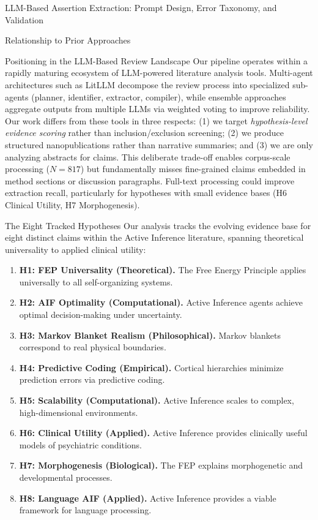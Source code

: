 \documentclass[
  ignorenonframetext,
]{beamer}
\providecommand{\tightlist}{%
  \setlength{\itemsep}{0pt}\setlength{\parskip}{0pt}}
\begin{document}
\begin{frame}{LLM-Based Assertion Extraction:
Prompt Design, Error Taxonomy, and Validation
\label{sec:extraction_pipeline}}
\begin{block}{Relationship to Prior Approaches}
\begin{block}{Positioning in the LLM-Based Review Landscape}
\protect{}\label{positioning-in-the-llm-based-review-landscape}
Our pipeline operates within a rapidly maturing ecosystem of LLM-powered
literature analysis tools. Multi-agent architectures such as LitLLM
decompose the review process into specialized sub-agents (planner,
identifier, extractor, compiler), while ensemble approaches aggregate
outputs from multiple LLMs via weighted voting to improve reliability.
Our work differs from these tools in three respects: (1) we target
\emph{hypothesis-level evidence scoring} rather than inclusion/exclusion
screening; (2) we produce structured nanopublications rather than
narrative summaries; and (3) we are only analyzing abstracts for claims.
This deliberate trade-off enables corpus-scale processing (\(N = 817\))
but fundamentally misses fine-grained claims embedded in method sections
or discussion paragraphs. Full-text processing could improve extraction
recall, particularly for hypotheses with small evidence bases (H6
Clinical Utility, H7 Morphogenesis).
\end{block}
\end{block}

\begin{block}{The Eight Tracked Hypotheses}
\protect{}\label{the-eight-tracked-hypotheses}
Our analysis tracks the evolving evidence base for eight distinct claims
within the Active Inference literature, spanning theoretical
universality to applied clinical utility:

\begin{enumerate}
\tightlist
\item
  \textbf{H1: FEP Universality (Theoretical).} The Free Energy Principle
  applies universally to all self-organizing systems.
\item
  \textbf{H2: AIF Optimality (Computational).} Active Inference agents
  achieve optimal decision-making under uncertainty.
\item
  \textbf{H3: Markov Blanket Realism (Philosophical).} Markov blankets
  correspond to real physical boundaries.
\item
  \textbf{H4: Predictive Coding (Empirical).} Cortical hierarchies
  minimize prediction errors via predictive coding.
\item
  \textbf{H5: Scalability (Computational).} Active Inference scales to
  complex, high-dimensional environments.
\item
  \textbf{H6: Clinical Utility (Applied).} Active Inference provides
  clinically useful models of psychiatric conditions.
\item
  \textbf{H7: Morphogenesis (Biological).} The FEP explains
  morphogenetic and developmental processes.
\item
  \textbf{H8: Language AIF (Applied).} Active Inference provides a
  viable framework for language processing.
\end{enumerate}
\end{block}


\end{frame}
\end{document}
